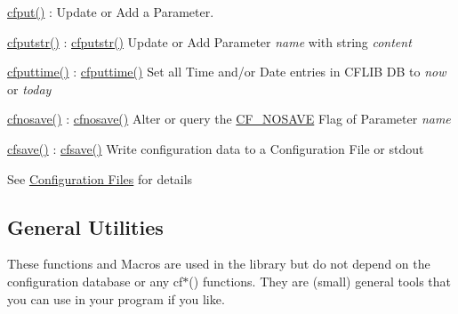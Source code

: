 \begin{DoxyItemize}
\item \hyperlink{group__setting__saving_gab4370bac1e151641bfb78e65f8ec4b44}{cfput()} \-: Update or Add a Parameter. 
\item \hyperlink{group__setting__saving_ga9553f7a24b080660793a560c2bc8f210}{cfputstr()} \-: \hyperlink{group__setting__saving_ga9553f7a24b080660793a560c2bc8f210}{cfputstr()} Update or Add Parameter {\itshape name\/} with string {\itshape content\/} 
\item \hyperlink{group__setting__saving_ga6f133f88dc253a6a80d13eed4d123063}{cfputtime()} \-: \hyperlink{group__setting__saving_ga6f133f88dc253a6a80d13eed4d123063}{cfputtime()} Set all Time and/or Date entries in C\-F\-L\-I\-B D\-B to {\itshape now\/} or {\itshape today\/} 
\item \hyperlink{group__setting__saving_ga0f6ed90e3ecfa0074af1635a0e4339ef}{cfnosave()} \-: \hyperlink{group__setting__saving_ga0f6ed90e3ecfa0074af1635a0e4339ef}{cfnosave()} Alter or query the \hyperlink{group__special__options__mask_gad76153c65f68cc0ee5c1a04c8c3e80bf}{C\-F\-\_\-\-N\-O\-S\-A\-V\-E} Flag of Parameter {\itshape name\/} 
\item \hyperlink{group__setting__saving_gaad7e1267cd904b4480a0eeaeb03b5f75}{cfsave()} \-: \hyperlink{group__setting__saving_gaad7e1267cd904b4480a0eeaeb03b5f75}{cfsave()} Write configuration data to a Configuration File or {\ttfamily stdout} 
\end{DoxyItemize}


\begin{DoxyItemize}
\item See \hyperlink{config_files}{Configuration Files} for details
\end{DoxyItemize}\hypertarget{index_general_utilities}{}\subsection{General Utilities}\label{index_general_utilities}
These functions and Macros are used in the library but do not depend on the configuration database or any cf$\ast$() functions. They are (small) general tools that you can use in your program if you like.


